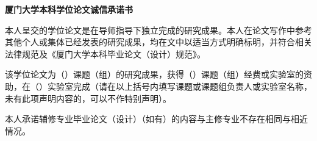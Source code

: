 \clearpage
\begingroup
{}
\setcounter{page}{1}
\vspace*{1\baselineskip}

\begin{center}
  \XiaoSan \Song \bfseries 厦门大学本科学位论文诚信承诺书
\end{center}

\vspace*{1\baselineskip}

\SiHao \Song

本人呈交的学位论文是在导师指导下独立完成的研究成果。本人在论文写作中参考其他个人或集体已经发表的研究成果，均在文中以适当方式明确标明，并符合相关法律规范及《厦门大学本科毕业论文（设计）规范》。

该学位论文为（\quad\quad\quad\quad\quad\quad）课题（组）的研究成果，获得（\quad\quad\quad\quad\quad\quad）课题（组）经费或实验室的资助，在（\quad\quad\quad\quad\quad\quad）实验室完成（请在以上括号内填写课题或课题组负责人或实验室名称，未有此项声明内容的，可以不作特别声明）。

本人承诺辅修专业毕业论文（设计）（如有）的内容与主修专业不存在相同与相近情况。

\vspace*{2\baselineskip}


\hspace{2pt}
\endgroup